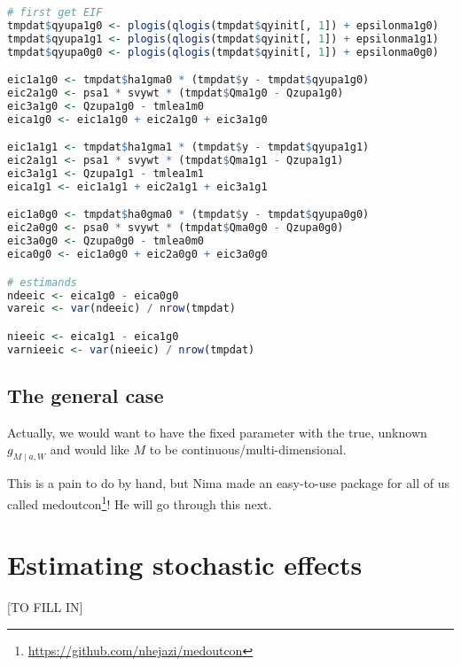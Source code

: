 \documentclass[
  12pt,
]{book}
\renewcommand{\href}[2]{#2\footnote{\url{#1}}}
\theoremstyle{definition}
\theoremstyle{definition}
\theoremstyle{definition}
\newcommand{\1}{\mathbbm{1}}
\begin{document}
\begin{lstlisting}[language=R]
# first get EIF
tmpdat$qyupa1g0 <- plogis(qlogis(tmpdat$qyinit[, 1]) + epsilonma1g0)
tmpdat$qyupa1g1 <- plogis(qlogis(tmpdat$qyinit[, 1]) + epsilonma1g1)
tmpdat$qyupa0g0 <- plogis(qlogis(tmpdat$qyinit[, 1]) + epsilonma0g0)

eic1a1g0 <- tmpdat$ha1gma0 * (tmpdat$y - tmpdat$qyupa1g0)
eic2a1g0 <- psa1 * svywt * (tmpdat$Qma1g0 - Qzupa1g0)
eic3a1g0 <- Qzupa1g0 - tmlea1m0
eica1g0 <- eic1a1g0 + eic2a1g0 + eic3a1g0

eic1a1g1 <- tmpdat$ha1gma1 * (tmpdat$y - tmpdat$qyupa1g1)
eic2a1g1 <- psa1 * svywt * (tmpdat$Qma1g1 - Qzupa1g1)
eic3a1g1 <- Qzupa1g1 - tmlea1m1
eica1g1 <- eic1a1g1 + eic2a1g1 + eic3a1g1

eic1a0g0 <- tmpdat$ha0gma0 * (tmpdat$y - tmpdat$qyupa0g0)
eic2a0g0 <- psa0 * svywt * (tmpdat$Qma0g0 - Qzupa0g0)
eic3a0g0 <- Qzupa0g0 - tmlea0m0
eica0g0 <- eic1a0g0 + eic2a0g0 + eic3a0g0

# estimands
ndeeic <- eica1g0 - eica0g0
vareic <- var(ndeeic) / nrow(tmpdat)

nieeic <- eica1g1 - eica1g0
varnieeic <- var(nieeic) / nrow(tmpdat)
\end{lstlisting}

\hypertarget{the-general-case}{%
\section{The general case}\label{the-general-case}}

Actually, we would want to have the fixed parameter with the true, unknown
\(g_{M \mid a, W}\) and would like \(M\) to be continuous/multi-dimensional.

This is a pain to do by hand, but Nima made an easy-to-use package for all of us
called \href{https://github.com/nhejazi/medoutcon}{medoutcon}! He will go through
this next.

\hypertarget{estimating-stochastic-effects}{%
\chapter{Estimating stochastic effects}\label{estimating-stochastic-effects}}

{[}TO FILL IN{]}

  

\backmatter
\printindex
\end{document}
